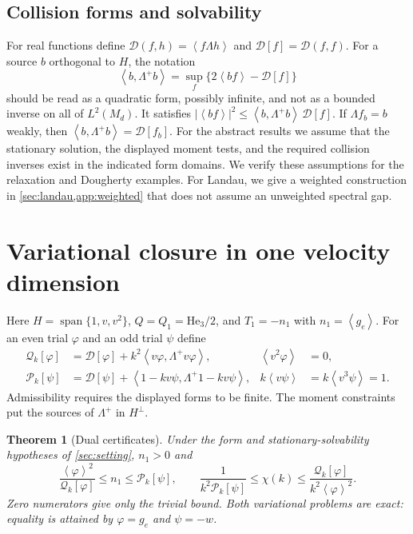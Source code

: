 \documentclass[11pt]{article}
\newcommand{\av}[1]{\left\langle #1\right\rangle}
\newcommand{\D}{\mathcal D}
\newcommand{\He}{\mathrm{He}}
\newcommand{\dual}[1]{\left\langle #1,\Lambda^+ #1\right\rangle}
\newtheorem{theorem}{Theorem}[section]
\theoremstyle{definition}
\theoremstyle{remark}
\numberwithin{equation}{section}
\begin{document}
\subsection{Collision forms and solvability}

For real functions define
$\D(f,h)=\av{f\Lambda h}$ and $\D[f]=\D(f,f)$.
For a source $b$ orthogonal to $H$, the notation
\begin{equation}
 \dual b=\sup_{f}\{2\av{bf}-\D[f]\}
 \label{eq:dualnorm}
\end{equation}
should be read as a quadratic form, possibly infinite, and not as a
bounded inverse on all of $L^2(M_d)$. It satisfies
$|\av{bf}|^2\leq\dual b\,\D[f]$.
If $\Lambda f_b=b$ weakly, then
$\dual b=\D[f_b]$.
For the abstract results we assume that the stationary solution, the
displayed moment tests, and the required collision inverses exist in the
indicated form domains. We verify these assumptions for the relaxation
and Dougherty examples. For Landau, we give a weighted construction
in \cref{sec:landau,app:weighted} that does not assume an unweighted
spectral gap.

\section{Variational closure in one velocity dimension}\label{sec:variational}

Here $H=\operatorname{span}\{1,v,v^2\}$, $Q=Q_1=\He_3/2$,
and $T_1=-n_1$ with $n_1=\av{g_e}$.
For an even trial $\varphi$ and an odd trial $\psi$ define
\begin{align}
 \mathcal Q_k[\varphi]&=\D[\varphi]+k^2\dual{v\varphi},
 &\av{v^2\varphi}&=0,\nonumber\\
 \mathcal P_k[\psi]&=\D[\psi]+\dual{1-kv\psi},
 &k\av{v\psi}&=k\av{v^3\psi}=1.
 \label{eq:trialforms}
\end{align}
Admissibility requires the displayed forms to be finite. The moment
constraints put the sources of $\Lambda^+$ in $H^\perp$.

\begin{theorem}[Dual certificates]\label{thm:dual}
Under the form and stationary-solvability hypotheses of
\cref{sec:setting}, $n_1>0$ and
\begin{equation}
 \frac{\av{\varphi}^2}{\mathcal Q_k[\varphi]}
       \leq n_1\leq \mathcal P_k[\psi],
 \qquad
 \frac{1}{k^2\mathcal P_k[\psi]}
       \leq \chi(k)
       \leq \frac{\mathcal Q_k[\varphi]}{k^2\av{\varphi}^2}.
 \label{eq:dualbounds}
\end{equation}
Zero numerators give only the trivial bound. Both variational problems
are exact: equality is attained by $\varphi=g_e$ and $\psi=-w$.
\end{theorem}
\end{document}
